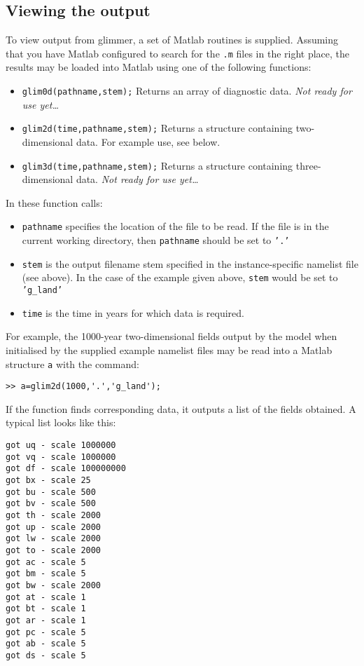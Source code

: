 \documentclass[11pt]{article}
\begin{document}
\subsection{Viewing the output}
%
To view output from glimmer, a set of Matlab routines is supplied. Assuming
that you have Matlab configured to search for the \texttt{.m} files in the
right place, the results may be loaded into Matlab using one of the following
functions:
%
\begin{itemize}
\item \texttt{glim0d(pathname,stem);} Returns an array of diagnostic
  data. \emph{Not ready for use yet\ldots}
\item \texttt{glim2d(time,pathname,stem);} Returns a structure containing
  two-dimensional data. For example use, see below.
\item \texttt{glim3d(time,pathname,stem);} Returns a structure containing
  three-dimensional data. \emph{Not ready for use yet\ldots}
\end{itemize}
%
In these function calls:
\begin{itemize}
\item \texttt{pathname} specifies the location of the file
to be read. If the file is in the current working directory, then
\texttt{pathname} should be set to \texttt{'.'}
\item \texttt{stem} is the output filename stem specified in the
  instance-specific namelist file (see above). In the case of the example
  given above, \texttt{stem} would be set to \texttt{'g\_land'}
\item \texttt{time} is the time in years for which data is required.
\end{itemize}
%
For example, the 1000-year two-dimensional fields output by the model when initialised
by the supplied example namelist files may be read into a Matlab structure
\texttt{a} with the command:
%
\begin{verbatim}
>> a=glim2d(1000,'.','g_land');
\end{verbatim}
%
If the function finds corresponding data, it outputs a list of the fields
obtained. A typical list looks like this:
%
\begin{verbatim}
got uq - scale 1000000
got vq - scale 1000000
got df - scale 100000000
got bx - scale 25
got bu - scale 500
got bv - scale 500
got th - scale 2000
got up - scale 2000
got lw - scale 2000
got to - scale 2000
got ac - scale 5
got bm - scale 5
got bw - scale 2000
got at - scale 1
got bt - scale 1
got ar - scale 1
got pc - scale 5
got ab - scale 5
got ds - scale 5
\end{verbatim}
\end{document}
